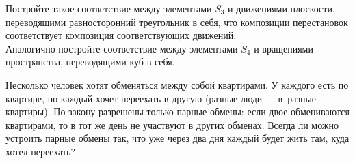 \documentclass[a4paper,12pt]{article}
\begin{document}



%

%
%
%



 Постройте такое соответствие между элементами $S_3$ и движениями плоскости, переводящими равносторонний треугольник в себя, что композиции перестановок  соответствует композиция соответствующих движений.\\
 Аналогично постройте соответствие между элементами $S_4$  и вращениями пространства, переводящими куб в себя.

Несколько человек хотят обменяться между собой квартирами.
У каждого есть по квартире, но каждый хочет переехать в другую
(разные люди --- в~разные квартиры).
По закону разрешены только парные
обмены: если двое обмениваются квартирами, то в тот же день не участвуют в других обменах.
Всегда ли можно устроить парные обмены так, что уже
через два дня каждый будет жить там, куда хотел переехать?






\end{document}
